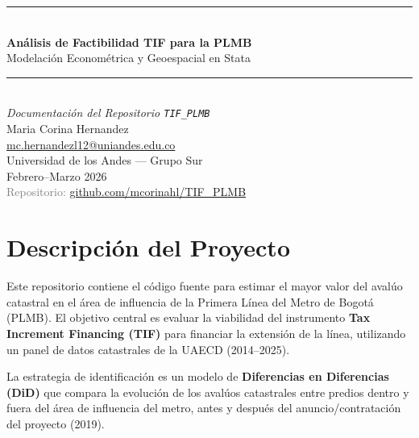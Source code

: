 \documentclass[12pt, a4paper]{article}
\begin{document}

\begin{titlepage}
  \centering
  \vspace*{2cm}
  {\color{uniandes}\rule{\linewidth}{1.5pt}}\\[0.4cm]
  {\LARGE\bfseries Análisis de Factibilidad TIF para la PLMB}\\[0.3cm]
  {\large Modelación Econométrica y Geoespacial en Stata}\\[0.2cm]
  {\color{uniandes}\rule{\linewidth}{1.5pt}}\\[1.5cm]
  {\large\itshape Documentación del Repositorio \texttt{TIF\_PLMB}}\\[2cm]
  {\large Maria Corina Hernandez}\\[0.3cm]
  {\normalsize \href{mailto:mc.hernandezl12@uniandes.edu.co}{mc.hernandezl12@uniandes.edu.co}}\\[0.5cm]
  {\normalsize Universidad de los Andes — Grupo Sur}\\[2cm]
  {\normalsize Febrero–Marzo 2026}\\[1cm]
  \vfill
  {\small\textcolor{gray}{Repositorio: \href{https://github.com/mcorinahl/TIF_PLMB}{github.com/mcorinahl/TIF\_PLMB}}}
\end{titlepage}

\tableofcontents
\newpage

\section{Descripción del Proyecto}

Este repositorio contiene el código fuente para estimar el mayor valor del avalúo catastral en el área de influencia de la Primera Línea del Metro de Bogotá (PLMB). El objetivo central es evaluar la viabilidad del instrumento \textbf{Tax Increment Financing (TIF)} para financiar la extensión de la línea, utilizando un panel de datos catastrales de la UAECD (2014–2025).

La estrategia de identificación es un modelo de \textbf{Diferencias en Diferencias (DiD)} que compara la evolución de los avalúos catastrales entre predios dentro y fuera del área de influencia del metro, antes y después del anuncio/contratación del proyecto (2019).

\end{document}
